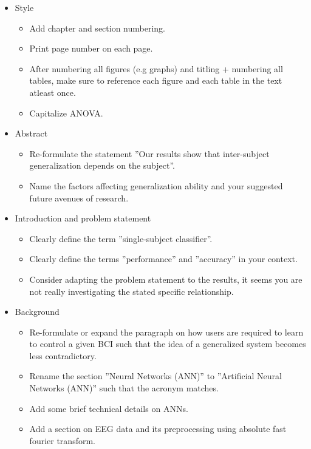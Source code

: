 \documentclass[a4paper,12pt]{article}
\begin{document}
\begin{itemize}
    \item Style
    \begin{itemize}
        \item Add chapter and section numbering.
        \item Print page number on each page.
        \item After numbering all figures (e.g graphs) and titling + numbering all tables, make sure
        to reference each figure and each table in the text atleast once.
        \item Capitalize ANOVA.
    \end{itemize}
    \item Abstract
    \begin{itemize}
        \item Re-formulate the statement ''Our results show that inter-subject generalization depends on the subject''.
        \item Name the factors affecting generalization ability and your suggested future avenues of research.
    \end{itemize}
    \item Introduction and problem statement
    \begin{itemize}
        \item Clearly define the term ''single-subject classifier''.
        \item Clearly define the terms ''performance'' and ''accuracy'' in your context.
        \item Consider adapting the problem statement to the results, it seems you are not really investigating the stated specific relationship.
    \end{itemize}
    \item Background
    \begin{itemize}
        \item Re-formulate or expand the paragraph on how users are required to learn to control
        a given BCI such that the idea of a generalized system becomes less contradictory.
        \item Rename the section ''Neural Networks (ANN)'' to ''Artificial Neural Networks (ANN)'' such
        that the acronym matches.
        \item Add some brief technical details on ANNs.
        \item Add a section on EEG data and its preprocessing using absolute fast fourier transform.
    \end{itemize}

\end{itemize}
\end{document}
